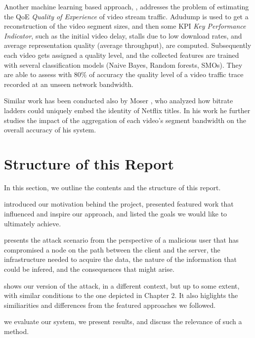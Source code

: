 Another machine learning based approach, \cite{qoe}, addresses the problem
of estimating the QoE \emph{Quality of Experience} of video stream traffic.
Adudump is used to get a reconstruction of the video segment sizes, and then
some KPI \emph{Key Performance Indicator}, such as the initial video delay,
stalls due to low download rates, and average representation quality (average
throughput), are computed. Subsequently each video gets assigned a quality
level, and the collected features are trained with several classification
models (Naive Bayes, Random forests, SMOs). They are able to assess with 80\%
of accuracy the quality level of a video traffic trace recorded at an unseen
network bandwidth. 

Similar work has been conducted also by Moser \cite{moser}, who analyzed how
bitrate ladders could uniquely embed the identity of Netflix titles. In his
work he further studies the impact of the aggregation of each video's segment
bandwidth on the overall accuracy of his system. 

\section{Structure of this Report}\label{sec:structure}
  
In this section, we outline the contents and the structure of this report.

 introduced our motivation behind the project, presented featured work
that influenced and inspire our approach, and listed the goals we would like to
ultimately achieve.

 presents the attack scenario from the perspective of a
malicious user that has compromised a node on the path between the client and
the server, the infrastructure needed to acquire the data, the nature of the
information that could be infered, and the consequences that might arise.

 shows our version of the attack, in a different context, but up to
some extent, with similar conditions to the one depicted in Chapter 2. It also
higlights the similiarities and differences from the featured approaches we
followed.

 we evaluate our system, we present results, and discuss the
relevance of such a method.


